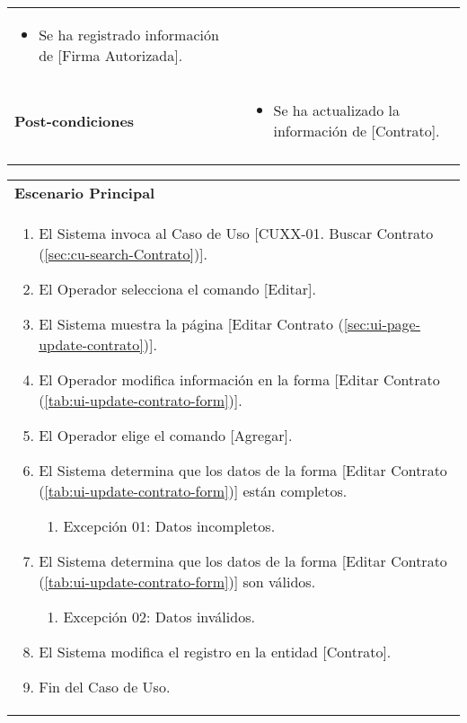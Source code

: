 \begin{tabular}{ p{3.5cm} p{11.5cm} }
\begin{minipage}[t]{0.6\textwidth}
\begin{itemize}[noitemsep,nolistsep]
				\item Se ha registrado informaci\'on de [Firma Autorizada].
			\end{itemize}
			\end{minipage} \\
		\textbf{Post-condiciones} &
			\begin{minipage}[t]{0.6\textwidth}
			\begin{itemize}[noitemsep,nolistsep]
			\setlength{\itemindent}{-.5cm}
				\item Se ha actualizado la informaci\'on de [Contrato].
			\end{itemize}
			\end{minipage} \\
		\\
	\end{tabular}
	
	\begin{tabular}{ p{15.5cm} }
		\textbf{Escenario Principal} \\
		\begin{enumerate}
			\item El Sistema invoca al Caso de Uso [CUXX-01. Buscar Contrato (\ref{sec:cu-search-Contrato})].
			\item El Operador selecciona el comando [Editar].
			\item El Sistema muestra la p\'agina [Editar Contrato (\ref{sec:ui-page-update-contrato})].
			\item El Operador modifica informaci\'on en la forma [Editar Contrato (\ref{tab:ui-update-contrato-form})].
			\item El Operador elige el comando [Agregar].
			\item El Sistema determina que los datos de la forma [Editar Contrato (\ref{tab:ui-update-contrato-form})] est\'an completos.
				\begin{enumerate}
					\item Excepci\'on 01: Datos incompletos.
				\end{enumerate}
			\item El Sistema determina que los datos de la forma [Editar Contrato (\ref{tab:ui-update-contrato-form})] son v\'alidos.
				\begin{enumerate}
					\item Excepci\'on 02: Datos inv\'alidos.
				\end{enumerate}
			\item El Sistema modifica el registro en la entidad [Contrato].
			\item Fin del Caso de Uso.
		\end{enumerate}
	\end{tabular}
	
